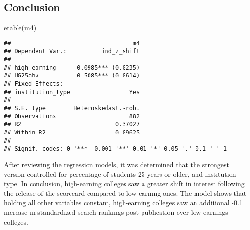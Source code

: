 \documentclass[
]{article}
\newenvironment{Shaded}{\begin{snugshade}}{\end{snugshade}}
\newcommand{\FunctionTok}[1]{\textcolor[rgb]{0.00,0.00,0.00}{#1}}
\newcommand{\NormalTok}[1]{#1}
\begin{document}
\hypertarget{conclusion}{%
\subsection{Conclusion}\label{conclusion}}

\begin{Shaded}
\begin{Highlighting}[]
\FunctionTok{etable}\NormalTok{(m4)}
\end{Highlighting}
\end{Shaded}

\begin{verbatim}
##                                   m4
## Dependent Var.:          ind_z_shift
##                                     
## high_earning     -0.0985*** (0.0235)
## UG25abv          -0.5085*** (0.0614)
## Fixed-Effects:   -------------------
## institution_type                 Yes
## ________________ ___________________
## S.E. type        Heteroskedast.-rob.
## Observations                     882
## R2                           0.37027
## Within R2                    0.09625
## ---
## Signif. codes: 0 '***' 0.001 '**' 0.01 '*' 0.05 '.' 0.1 ' ' 1
\end{verbatim}

After reviewing the regression models, it was determined that the
strongest version controlled for percentage of students 25 years or
older, and institution type. In conclusion, high-earning colleges saw a
greater shift in interest following the release of the scorecard
compared to low-earning ones. The model shows that holding all other
variables constant, high-earning colleges saw an additional -0.1
increase in standardized search rankings post-publication over
low-earnings colleges.
\end{document}
